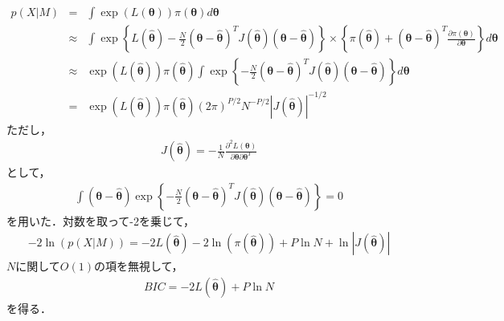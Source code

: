 \begin{eqnarray}
  p(X|M) 
&=& \int \exp(L(\bm{\theta})) \pi(\bm{\theta}) d\bm{\theta}  \nonumber \\
&\approx& \int \exp\left\{L(\bm{\hat{\theta}}) - \frac{N}{2}(\bm{\theta}-\bm{\hat{\theta}})^TJ(\bm{\hat{\theta}}) (\bm{\theta} - \bm{\hat{\theta}})\right\} 
\times \left\{\pi(\bm{\hat{\theta}}) + (\bm{\theta} - \bm{\hat{\theta}})^T\frac{\partial \pi(\bm{\theta})}{\partial \bm{\theta}}\right\} d\bm{\theta}\nonumber \\
&\approx& \exp(L(\bm{\hat{\theta}})) \pi(\bm{\hat{\theta}}) \int \exp \left\{ - \frac{N}{2}(\bm{\theta}-\bm{\hat{\theta}})^TJ(\bm{\hat{\theta}}) (\bm{\theta} - \bm{\hat{\theta}})\right\}d\bm{\theta} \nonumber \\  
&=& \exp(L(\bm{\hat{\theta}})) \pi(\bm{\hat{\theta}}) (2 \pi)^{P/2}N^{-P/2}|J(\bm{\hat{\theta}})|^{-1/2}
\label{eq:lap_3}
\end{eqnarray}
ただし，
\begin{eqnarray}
  \label{eq:4}
  J(\bm{\hat{\theta}}) = - \frac{1}{N}\frac{\partial^2 L(\bm{\theta})}{\partial \bm{\theta} \partial \bm{\theta}^T} 
\end{eqnarray}
として，
\begin{eqnarray}
  \label{eq:5}
  \int (\bm{\theta} - \bm{\hat{\theta}})\exp\left\{- \frac{N}{2}(\bm{\theta}-\bm{\hat{\theta}})^TJ(\bm{\hat{\theta}}) (\bm{\theta} - \bm{\hat{\theta}})\right\} =0
\end{eqnarray}
を用いた．対数を取って-2を乗じて，
\begin{eqnarray}
  \label{eq:6}
  -2\ln(p(X|M)) =-2 L(\bm{\hat{\theta}}) -2 \ln(\pi(\bm{\hat{\theta}})) + P\ln N + \ln{ |J(\bm{\hat{\theta}})|}
\end{eqnarray}
$N$に関して$O(1)$の項を無視して， 
\begin{eqnarray}
  \label{eq:7}
  BIC = -2 L(\bm{\hat{\theta}}) + P\ln{N}
\end{eqnarray}
を得る．






